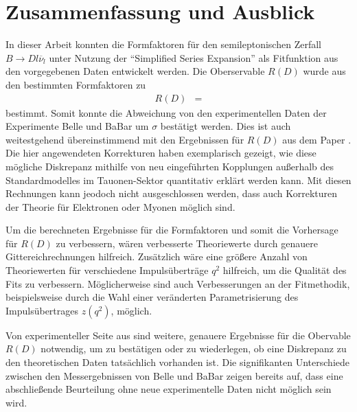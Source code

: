 \chapter{Zusammenfassung und Ausblick}

In dieser Arbeit konnten die Formfaktoren für den semileptonischen Zerfall $B \to D l \overline{\nu}_l$ unter Nutzung der \enquote{Simplified Series Expansion} als Fitfunktion aus den vorgegebenen Daten entwickelt werden.
Die Oberservable $R(D)$ wurde aus den bestimmten Formfaktoren zu
\begin{align*}
  R(D) &= 
\end{align*}
bestimmt.
Somit konnte die Abweichung von den experimentellen Daten der Experimente Belle und BaBar um $\sigma$ bestätigt werden.
Dies ist auch weitestgehend übereinstimmend mit den Ergebnissen für $R(D)$ aus dem Paper \cite{PhysRevD.92.034506}.
Die hier angewendeten Korrekturen haben exemplarisch gezeigt, wie diese mögliche Diskrepanz mithilfe von neu eingeführten Kopplungen außerhalb des Standardmodelles im Tauonen-Sektor quantitativ erklärt werden kann.
Mit diesen Rechnungen kann jeodoch nicht ausgeschlossen werden, dass auch Korrekturen der Theorie für Elektronen oder Myonen möglich sind.

Um die berechneten Ergebnisse für die Formfaktoren und somit die Vorhersage für $R(D)$ zu verbessern, wären verbesserte Theoriewerte durch genauere Gittereichrechnungen hilfreich.
Zusätzlich wäre eine größere Anzahl von Theoriewerten für verschiedene Impulsüberträge $q^2$ hilfreich, um die Qualität des Fits zu verbessern.
Möglicherweise sind auch Verbesserungen an der Fitmethodik, beispielsweise durch die Wahl einer veränderten Parametrisierung des Impulsübertrages $z(q^2)$, möglich.

Von experimenteller Seite aus sind weitere, genauere Ergebnisse für die Obervable $R(D)$ notwendig, um zu bestätigen oder zu wiederlegen, ob eine Diskrepanz zu den theoretischen Daten tatsächlich vorhanden ist.
Die signifikanten Unterschiede zwischen den Messergebnissen von Belle und BaBar zeigen bereits auf, dass eine abschließende Beurteilung ohne neue experimentelle Daten nicht möglich sein wird.
